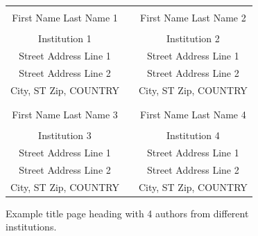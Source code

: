 \documentclass{wscpaperproc}
\theoremstyle{wsc}
\begin{document}
\begin{figure}[htb]
{
\centering
\begin{tabular}{ccc}
\phantom{Adjust spacing using these entries} & \phantom{intermediate space} & \phantom{Adjust spacing using these entries} \\
First Name Last Name 1 & & First Name Last Name 2 \\
\\
Institution 1 & & Institution 2 \\
Street Address Line 1 & & Street Address Line 1 \\
Street Address Line 2 & & Street Address Line 2 \\
City, ST Zip, COUNTRY & & City, ST Zip, COUNTRY \\
\\ \\
First Name Last Name 3 & & First Name Last Name 4 \\
\\
Institution 3 & & Institution 4 \\
Street Address Line 1 & & Street Address Line 1 \\
Street Address Line 2 & & Street Address Line 2 \\
City, ST Zip, COUNTRY & & City, ST Zip, COUNTRY
\end{tabular}
\caption{Example title page heading with 4 authors from different institutions.\label{fig: 4 different}}
}
\end{figure}
\end{document}
